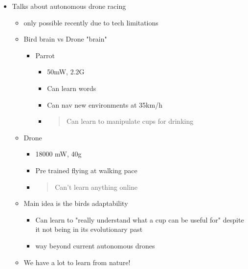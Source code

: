 \documentclass[letterpaper]{article}
\begin{document}
\begin{itemize}
\item Talks about autonomous drone racing

\begin{itemize}
\item only possible recently due to tech limitations
\item Bird brain vs Drone "brain"

\begin{itemize}
\item Parrot

\begin{itemize}
\item 50mW, 2.2G

\item Can learn words

\item Can nav new environments at 35km/h

\item \begin{quote}
Can learn to manipulate cups for drinking
\end{quote}
\end{itemize}
\end{itemize}

\item Drone

\begin{itemize}
\item 18000 mW, 40g

\item Pre trained flying at walking pace

\item \begin{quote}
Can't learn anything online
\end{quote}
\end{itemize}

\item Main idea is the birds adaptability

\begin{itemize}
\item Can learn to "really understand what a cup can be useful for"
despite it not being in its evolutionary past
\item way beyond current autonomous drones
\end{itemize}

\item We have a lot to learn from nature!
\end{itemize}


\end{itemize}
\end{document}
